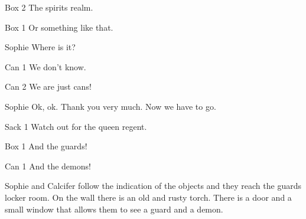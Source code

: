 \begin{screenplay}
\begin{dialogue}{Box 2}
The spirits realm.
\end{dialogue}
\begin{dialogue}{Box 1}
Or something like that.
\end{dialogue}
\begin{dialogue}{Sophie}
Where is it?
\end{dialogue}
\begin{dialogue}{Can 1}
We don’t know.
\end{dialogue}
\begin{dialogue}{Can 2}
We are just cans!
\end{dialogue}
\begin{dialogue}{Sophie}
Ok, ok. Thank you very much. Now we have to go.
\end{dialogue}
\begin{dialogue}{Sack 1}
Watch out for the queen regent.
\end{dialogue}
\begin{dialogue}{Box 1}
And the guards!
\end{dialogue}
\begin{dialogue}{Can 1}
And the demons!
\end{dialogue}
\end{screenplay}
\vspace{1em}


Sophie and Calcifer follow the indication of the objects and they reach the guards locker room. On the wall there is an old and rusty torch. There is a door and a small window that allows them to see a guard and a demon.

